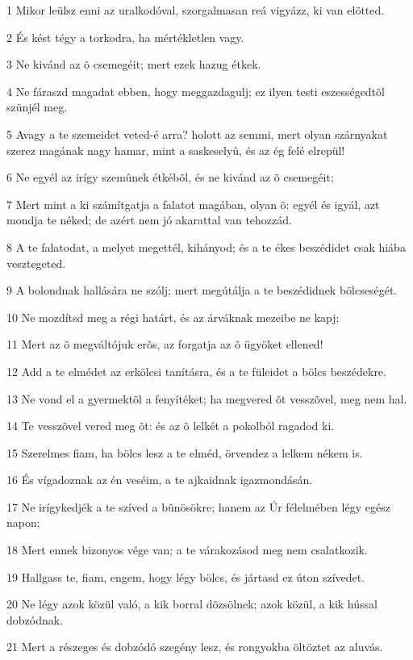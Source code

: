 \par 1 Mikor leülsz enni az uralkodóval, szorgalmasan reá vigyázz, ki van elõtted.
\par 2 És kést tégy a torkodra, ha mértékletlen vagy.
\par 3 Ne kivánd az õ csemegéit; mert ezek hazug étkek.
\par 4 Ne fáraszd magadat ebben, hogy meggazdagulj; ez ilyen testi eszességedtõl szünjél meg.
\par 5 Avagy a te szemeidet veted-é arra? holott az semmi, mert olyan szárnyakat szerez magának nagy hamar, mint a saskeselyû, és az ég felé elrepül!
\par 6 Ne egyél az irígy szemûnek étkébõl, és ne kivánd az õ csemegéit;
\par 7 Mert mint a ki számítgatja a falatot magában, olyan õ: egyél és igyál, azt mondja te néked; de azért nem jó akarattal van tehozzád.
\par 8 A te falatodat, a melyet megettél, kihányod; és a te ékes beszédidet csak hiába vesztegeted.
\par 9 A bolondnak hallására ne szólj; mert megútálja a te beszédidnek bölcseségét.
\par 10 Ne mozdítsd meg a régi  határt, és az árváknak mezeibe ne kapj;
\par 11 Mert az õ megváltójuk erõs, az forgatja az õ ügyöket ellened!
\par 12 Add a te elmédet az erkölcsi tanításra, és a te füleidet a bölcs beszédekre.
\par 13 Ne vond el a gyermektõl a fenyítéket; ha megvered õt vesszõvel, meg nem hal.
\par 14 Te vesszõvel vered meg õt: és az õ lelkét a pokolból ragadod ki.
\par 15 Szerelmes fiam, ha bölcs lesz a te elméd, örvendez a lelkem nékem is.
\par 16 És vígadoznak az én veséim, a te ajkaidnak igazmondásán.
\par 17 Ne irígykedjék a te szíved a bûnösökre; hanem az Úr félelmében légy egész napon;
\par 18 Mert ennek bizonyos vége van; a te várakozásod meg nem csalatkozik.
\par 19 Hallgass te, fiam, engem, hogy légy bölcs, és jártasd ez úton szívedet.
\par 20 Ne légy azok közül való, a kik borral dõzsölnek; azok közül, a kik hússal dobzódnak.
\par 21 Mert a részeges és dobzódó szegény lesz, és rongyokba öltöztet az aluvás.
